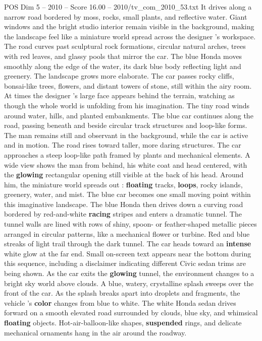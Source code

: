 \begin{textsample}{POS Dim 5 – 2010 – Score 16.00 – 2010/tv\_com\_2010\_53.txt}
It drives along a narrow road bordered by moss, rocks, small plants, and reflective water.
Giant windows and the bright studio interior remain visible in the background, making the landscape feel like a miniature world spread across the designer ’s workspace.
The road curves past sculptural rock formations, circular natural arches, trees with red leaves, and glassy pools that mirror the car.
The blue Honda moves smoothly along the edge of the water, its dark blue body reflecting light and greenery.
The landscape grows more elaborate.
The car passes rocky cliffs, bonsai-like trees, flowers, and distant towers of stone, still within the airy room.
At times the designer ’s large face appears behind the terrain, watching as though the whole world is unfolding from his imagination.
The tiny road winds around water, hills, and planted embankments.
The blue car continues along the road, passing beneath and beside circular track structures and loop-like forms.
The man remains still and observant in the background, while the car is active and in motion.
The road rises toward taller, more daring structures.
The car approaches a steep loop-like path framed by plants and mechanical elements.
A wide view shows the man from behind, his white coat and head centered, with the \textbf{glowing} rectangular opening still visible at the back of his head.
Around him, the miniature world spreads out : \textbf{floating} tracks, \textbf{loops}, rocky islands, greenery, water, and mist.
The blue car becomes one small moving point within this imaginative landscape.
The blue Honda then drives down a curving road bordered by red-and-white \textbf{racing} stripes and enters a dramatic tunnel.
The tunnel walls are lined with rows of shiny, spoon- or feather-shaped metallic pieces arranged in circular patterns, like a mechanical flower or turbine.
Red and blue streaks of light trail through the dark tunnel.
The car heads toward an \textbf{intense} white glow at the far end.
Small on-screen text appears near the bottom during this sequence, including a disclaimer indicating different Civic sedan trims are being shown.
As the car exits the \textbf{glowing} tunnel, the environment changes to a bright sky world above clouds.
A blue, watery, crystalline splash sweeps over the front of the car.
As the splash breaks apart into droplets and fragments, the vehicle ’s \textbf{color} changes from blue to white.
The white Honda sedan drives forward on a smooth elevated road surrounded by clouds, blue sky, and whimsical \textbf{floating} objects.
Hot-air-balloon-like shapes, \textbf{suspended} rings, and delicate mechanical ornaments hang in the air around the roadway.

\end{textsample}
